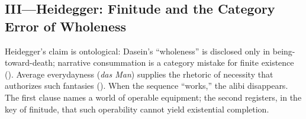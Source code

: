\subsection*{III—Heidegger: Finitude and the Category Error of Wholeness}
\label{ssec:iii-heidegger}
Heidegger’s claim is ontological: Dasein’s “wholeness” is disclosed only in being-toward-death; narrative consummation is a category mistake for finite existence (\parencite[pp.~294--307]{HeideggerBT1962}). Average everydayness (\emph{das Man}) supplies the rhetoric of necessity that authorizes such fantasies (\parencite[pp.~149--168]{HeideggerBT1962}). When the sequence “works,” the alibi disappears. The first clause names a world of operable equipment; the second registers, in the key of finitude, that such operability cannot yield existential completion.
